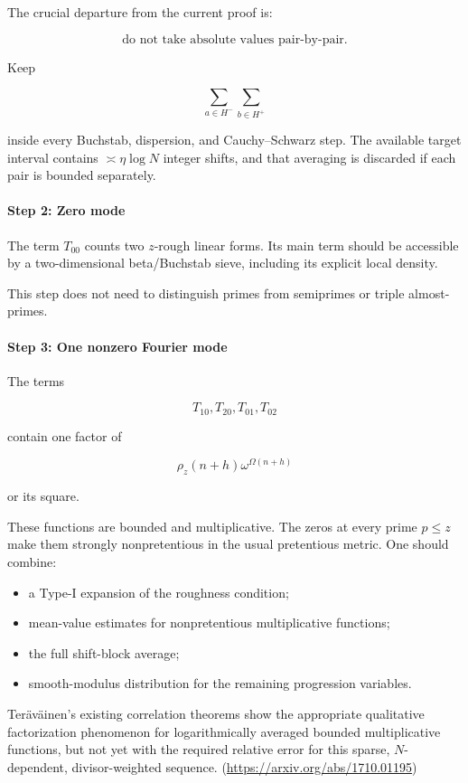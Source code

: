 The crucial departure from the current proof is:

\[
\text{do not take absolute values pair-by-pair.}
\]

Keep

\[
\sum_{a\in H^-}\sum_{b\in H^+}
\]

inside every Buchstab, dispersion, and Cauchy–Schwarz step. The available target interval contains \(\asymp\eta\log N\) integer shifts, and that averaging is discarded if each pair is bounded separately.

\paragraph{Step 2: Zero mode}

The term \(T_{00}\) counts two \(z\)-rough linear forms. Its main term should be accessible by a two-dimensional beta/Buchstab sieve, including its explicit local density.

This step does not need to distinguish primes from semiprimes or triple almost-primes.

\paragraph{Step 3: One nonzero Fourier mode}

The terms

\[
T_{10},T_{20},T_{01},T_{02}
\]

contain one factor of

\[
\rho_z(n+h)\omega^{\Omega(n+h)}
\]

or its square.

These functions are bounded and multiplicative. The zeros at every prime \(p\le z\) make them strongly nonpretentious in the usual pretentious metric. One should combine:

\begin{itemize}
\item a Type-I expansion of the roughness condition;
\item mean-value estimates for nonpretentious multiplicative functions;
\item the full shift-block average;
\item smooth-modulus distribution for the remaining progression variables.
\end{itemize}

Teräväinen’s existing correlation theorems show the appropriate qualitative factorization phenomenon for logarithmically averaged bounded multiplicative functions, but not yet with the required relative error for this sparse, \(N\)-dependent, divisor-weighted sequence. (\url{https://arxiv.org/abs/1710.01195})

